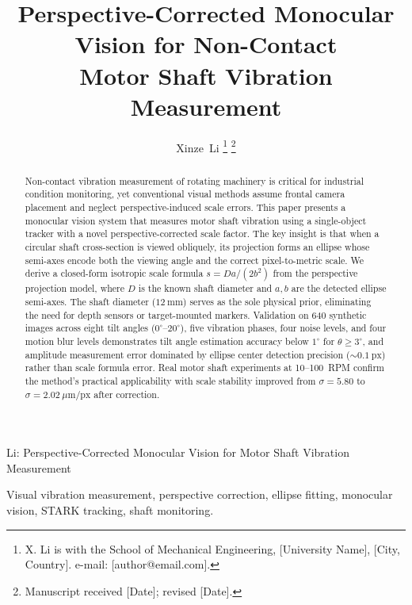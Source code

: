 \documentclass[journal]{IEEEtran}
\begin{document}
\title{Perspective-Corrected Monocular Vision for Non-Contact\\Motor Shaft Vibration Measurement}

\author{Xinze~Li
\thanks{X. Li is with the School of Mechanical Engineering, [University Name],
[City, Country]. e-mail: [author@email.com].}%
\thanks{Manuscript received [Date]; revised [Date].}}

%
{Li: Perspective-Corrected Monocular Vision for Motor Shaft Vibration Measurement}

\maketitle

\begin{abstract}
Non-contact vibration measurement of rotating machinery is critical for industrial
condition monitoring, yet conventional visual methods assume frontal camera placement
and neglect perspective-induced scale errors. This paper presents a monocular vision
system that measures motor shaft vibration using a single-object tracker with a
novel perspective-corrected scale factor. The key insight is that when a circular
shaft cross-section is viewed obliquely, its projection forms an ellipse whose
semi-axes encode both the viewing angle and the correct pixel-to-metric scale.
We derive a closed-form isotropic scale formula $s = D a / (2b^{2})$ from the
perspective projection model, where $D$ is the known shaft diameter and $a,b$
are the detected ellipse semi-axes. The shaft diameter ($12~\text{mm}$) serves
as the sole physical prior, eliminating the need for depth sensors or target-mounted
markers. Validation on 640 synthetic images across eight tilt angles
($0^{\circ}$--$20^{\circ}$), five vibration phases, four noise levels, and four
motion blur levels demonstrates tilt angle estimation accuracy below
$1^{\circ}$ for $\theta \geq 3^{\circ}$, and amplitude measurement error
dominated by ellipse center detection precision ($\sim 0.1~\text{px}$) rather
than scale formula error. Real motor shaft experiments at 10--100~RPM confirm
the method's practical applicability with scale stability improved from
$\sigma = 5.80$ to $\sigma = 2.02~\mu\text{m/px}$ after correction.
\end{abstract}

\begin{IEEEkeywords}
Visual vibration measurement, perspective correction, ellipse fitting, monocular
vision, STARK tracking, shaft monitoring.
\end{IEEEkeywords}
\end{document}
